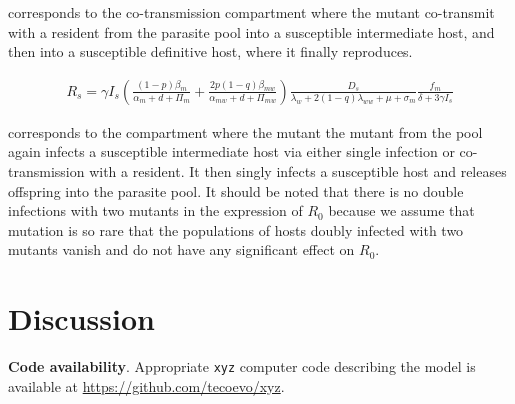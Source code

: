 \documentclass{article}
\begin{document}
corresponds to the co-transmission compartment where the mutant co-transmit with a resident from the parasite pool into a susceptible intermediate host, and then into a susceptible definitive host, where it finally reproduces.

\begin{align*}
R_s = \gamma  I_s \left(\frac{(1-p) \beta_m}{\alpha_m + d + \Pi_m} + \frac{2 p (1-q) \beta_{mw}}{\alpha_{mw} + d + \Pi_{mw}}\right) \frac{D_s}{\lambda_w  + 2 (1-q) \lambda_{ww} + \mu + \sigma_m}\frac{f_m}{\delta +3 \gamma  I_s}
\end{align*}

corresponds to the compartment where the mutant the mutant from the pool again infects a susceptible intermediate host via either single infection or co-transmission with a resident. It then singly infects a susceptible host and releases offspring into the parasite pool. It should be noted that there is no double infections with two mutants in the expression of $R_0$ because we assume that mutation is so rare that the populations of hosts doubly infected with two mutants vanish and do not have any significant effect on $R_0$.

\section{Discussion}

\textbf{Code availability}.
Appropriate {\tt{xyz}} computer code describing the model is available at {\url{https://github.com/tecoevo/xyz}}.







\appendix
\end{document}
